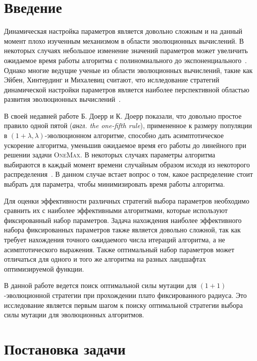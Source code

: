 \documentclass[russian]{article}
\newcommand{\OM}{\textsc{OneMax}\xspace}
\newcommand{\OPO}{$(1 + 1)$}
\begin{document}
\section{Введение}

Динамическая настройка параметров является довольно сложным и на данный момент плохо изученным механизмом в области эволюционных вычислений. В некоторых случаях небольшое изменение значений параметров может увеличить ожидаемое время работы алгоритма с полиномиального до экспоненциального~\cite{doerr_mutation_rate_matters,on_one_plus_one}. Однако многие ведущие ученые из области эволюционных вычислений, такие как Эйбен, Хинтердинг и Михалевиц считают, что ислледование стратегий динамической настройки параметров является наиболее перспективной областью развития эволюционных вычислений~\cite{parameter_control}.

В своей недавней работе Б. Доерр и К. Доерр показали, что довольно простое правило одной пятой (\textit{англ. the one-fifth rule}), примененное к размеру популяции в $(1 + \lambda, \lambda)$-эволюционном алгоритме, способно дать асимптотическое ускорение алгоритма, уменьшив ожидаемое время его работы до линейного при решении задачи \OM. В некоторых случаях параметры алгоритма выбираются в каждый момент времени случайным образом исходя из некоторого распределения~\cite{fga}. В данном случае встает вопрос о том, какое распределение стоит выбрать для параметра, чтобы минимизировать время работы алгоритма.

Для оценки эффективности различных стратегий выбора параметров необходимо сравнить их с наиболее эффективными алгоритмами, которые используют фиксированный набор параметров. Задача нахождения наиболее эффективного набора фиксированных параметров также является довольно сложной, так как требует нахождения точного ожидаемого числа итераций алгоритма, а не асимптотического выражения. Также оптимальный набор параметров может отличаться для одного и того же алгоритма на разных ландшафтах оптимизируемой функции.

В данной работе ведется поиск оптимальной силы мутации для \OPO-эволюционной стратегии при прохождении плато фиксированного радиуса. Это исследование является первым шагом к поиску оптимальной стратегии выбора силы мутации для эволюционных алгоритмов.


\section{Постановка задачи}
\end{document}
